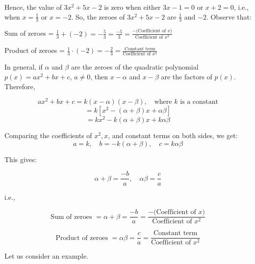 \documentclass[12pt]{article}
\begin{document}
Hence, the value of \( 3x^2 + 5x - 2 \) is zero when either \( 3x - 1 = 0 \) or \( x + 2 = 0 \), i.e.,
when \( x = \frac{1}{3} \) or \( x = -2 \). So, the zeroes of \( 3x^2 + 5x - 2 \) are \( \frac{1}{3} \) and \( -2 \). Observe that:

\bigskip
\hspace*{6em} Sum of zeroes = \( \frac{1}{3} + (-2) = -\frac{5}{3} = \frac{-5}{3} = \frac{-\text{(Coefficient of } x)}{\text{Coefficient of } x^2} \)

\bigskip
\hspace*{6em} Product of zeroes = \( \frac{1}{3} \cdot (-2) = -\frac{2}{3} = \frac{\text{Constant term}}{\text{Coefficient of } x^2} \)

\bigskip

In general, if \( \alpha \) and \( \beta \) are the zeroes of the quadratic polynomial \( p(x) = ax^2 + bx + c \), \( a \neq 0 \), then \( x - \alpha \) and \( x - \beta \) are the factors of \( p(x) \). Therefore,

\[
ax^2 + bx + c = k(x - \alpha)(x - \beta), \quad \text{where } k \text{ is a constant}
\]
\[
= k[x^2 - (\alpha + \beta)x + \alpha\beta]
\]
\[
= kx^2 - k(\alpha + \beta)x + k\alpha\beta
\]

Comparing the coefficients of \( x^2, x \), and constant terms on both sides, we get:
\[
a = k, \quad b = -k(\alpha + \beta), \quad c = k\alpha\beta
\]

This gives:

\[
\alpha + \beta = \frac{-b}{a}, \quad \alpha \beta = \frac{c}{a}
\]

i.e.,

\[
\text{Sum of zeroes } = \alpha + \beta = \frac{-b}{a} = \frac{-\text{(Coefficient of } x)}{\text{Coefficient of } x^2}
\]

\[
\text{Product of zeroes } = \alpha \beta = \frac{c}{a} = \frac{\text{Constant term}}{\text{Coefficient of } x^2}
\]

Let us consider an example.
\end{document}
